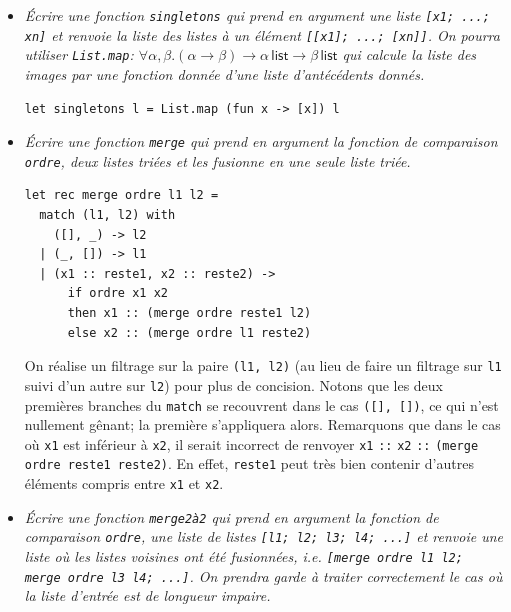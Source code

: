 \documentclass[11pt, a4paper]{article}
\begin{document}
\begin{itemize}

  \item[\textbf{B.1}] \emph{Écrire une fonction
      \texttt{singletons} qui prend en argument une liste \texttt{[x1;
      ...; xn]} et renvoie la liste des listes à un élément
      \texttt{[[x1]; ...; [xn]]}. On pourra utiliser {\tt List.map}:
      $\forall \alpha,\beta.(\alpha \rightarrow \beta) \rightarrow
      \alpha \, \textsf{list} \rightarrow \beta \, \textsf{list}$ qui
      calcule la liste des images par une fonction donnée d'une liste
      d'antécédents donnés.}

      \smallskip

      \begin{verbatim}
let singletons l = List.map (fun x -> [x]) l
      \end{verbatim}

      \smallskip

  \item[\textbf{B.2}] \emph{Écrire une fonction {\tt merge} qui
      prend en argument la fonction de comparaison \texttt{ordre},
      deux listes triées et les fusionne en une seule liste triée.}

      \smallskip

      \begin{verbatim}
let rec merge ordre l1 l2 =
  match (l1, l2) with
    ([], _) -> l2
  | (_, []) -> l1
  | (x1 :: reste1, x2 :: reste2) ->
      if ordre x1 x2
      then x1 :: (merge ordre reste1 l2)
      else x2 :: (merge ordre l1 reste2)
      \end{verbatim}

      On réalise un filtrage sur la paire \verb+(l1, l2)+ (au lieu de
      faire un filtrage sur {\tt l1} suivi d'un autre sur {\tt l2})
      pour plus de concision. Notons que les deux premières branches
      du {\tt match} se recouvrent dans le cas \verb+([], [])+, ce qui
      n'est nullement gênant; la première s'appliquera
      alors. Remarquons que dans le cas où {\tt x1} est inférieur à
      {\tt x2}, il serait incorrect de renvoyer \texttt{x1} \verb+::+
      \texttt{x2} \verb+::+ \texttt{(merge ordre reste1 reste2)}.  En
      effet, {\tt reste1} peut très bien contenir d'autres éléments
      compris entre {\tt x1} et {\tt x2}.

      \smallskip

  \item[\textbf{B.3}] \emph{Écrire une fonction {\tt merge2à2} qui
      prend en argument la fonction de comparaison \texttt{ordre}, une
      liste de listes \texttt{[l1; l2; l3; l4; ...]}  et renvoie une
      liste où les listes voisines ont été fusionnées, i.e.
      \texttt{[merge ordre l1 l2; merge ordre l3 l4; ...]}. On prendra
      garde à traiter correctement le cas où la liste d'entrée est de
      longueur impaire.}


\end{itemize}
\end{document}
